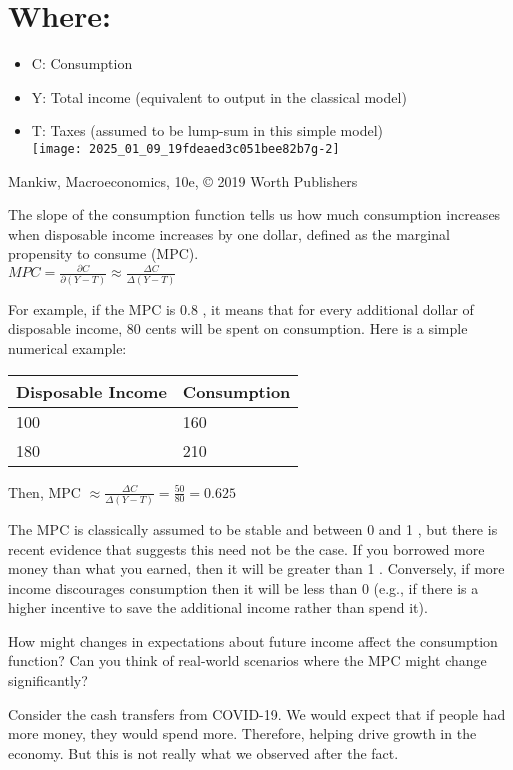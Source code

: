 \documentclass[10pt]{article}
\begin{document}
\section*{Where:}
\begin{itemize}
  \item C: Consumption
  \item Y: Total income (equivalent to output in the classical model)
  \item T: Taxes (assumed to be lump-sum in this simple model)\\
\texttt{[image: 2025\_01\_09\_19fdeaed3c051bee82b7g-2]}
\end{itemize}

Mankiw, Macroeconomics, 10e, © 2019 Worth Publishers

The slope of the consumption function tells us how much consumption increases when disposable income increases by one dollar, defined as the marginal propensity to consume (MPC).\\
$M P C=\frac{\partial C}{\partial(Y-T)} \approx \frac{\Delta C}{\Delta(Y-T)}$

For example, if the MPC is 0.8 , it means that for every additional dollar of disposable income, 80 cents will be spent on consumption. Here is a simple numerical example:

\begin{center}
\begin{tabular}{|l|l|}
\hline
Disposable Income & Consumption \\
\hline
100 & 160 \\
\hline
180 & 210 \\
\hline
\end{tabular}
\end{center}

Then, MPC $\approx \frac{\Delta C}{\Delta(Y-T)}=\frac{50}{80}=0.625$

The MPC is classically assumed to be stable and between 0 and 1 , but there is recent evidence that suggests this need not be the case. If you borrowed more money than what you earned, then it will be greater than 1 . Conversely, if more income discourages consumption then it will be less than 0 (e.g., if there is a higher incentive to save the additional income rather than spend it).

How might changes in expectations about future income affect the consumption function? Can you think of real-world scenarios where the MPC might change significantly?

Consider the cash transfers from COVID-19. We would expect that if people had more money, they would spend more. Therefore, helping drive growth in the economy. But this is not really what we observed after the fact.
\end{document}
